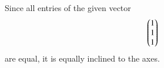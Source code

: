 Since all entries of the given vector 
\begin{align}
\begin{pmatrix}1\\1\\1\end{pmatrix}
\end{align}
are equal, it is equally inclined to the axes.
